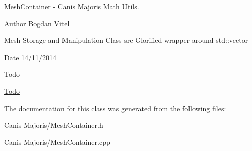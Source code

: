 \hyperlink{class_mesh_container}{Mesh\+Container} -\/ Canis Majoris Math Utils. 

\begin{DoxyAuthor}{Author}
Bogdan Vitel
\end{DoxyAuthor}
Mesh Storage and Manipulation Class src Glorified wrapper around std\+::vector \begin{DoxyDate}{Date}
14/11/2014 
\end{DoxyDate}
\begin{DoxyRefDesc}{Todo}
\item[\hyperlink{todo__todo000010}{Todo}]\begin{DoxyVerb}\end{DoxyVerb}
\end{DoxyRefDesc}


The documentation for this class was generated from the following files\+:\begin{DoxyCompactItemize}
\item 
Canis Majoris/Mesh\+Container.\+h\item 
Canis Majoris/Mesh\+Container.\+cpp\end{DoxyCompactItemize}
